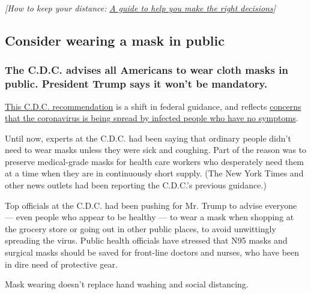 \emph{{[}How to keep your distance:}
\href{https://www.nytimes3xbfgragh.onion/2020/03/19/well/live/coronavirus-quarantine-social-distancing.html}{\emph{A
guide to help you make the right decisions}}\emph{{]}}

\hypertarget{consider-wearing-a-mask-in-public}{%
\subsection{Consider wearing a mask in
public}\label{consider-wearing-a-mask-in-public}}

\hypertarget{the-cdc-advises-all-americans-to-wear-cloth-masks-in-public-president-trump-says-it-wont-be-mandatory}{%
\subsubsection{\texorpdfstring{\textbf{The C.D.C. advises all Americans
to wear cloth masks in public. President Trump says it won't be
mandatory.}}{The C.D.C. advises all Americans to wear cloth masks in public. President Trump says it won't be mandatory.}}\label{the-cdc-advises-all-americans-to-wear-cloth-masks-in-public-president-trump-says-it-wont-be-mandatory}}

\href{https://www.nytimes3xbfgragh.onion/2020/04/03/world/coronavirus-news-updates.html}{This
C.D.C. recommendation} is a shift in federal guidance, and reflects
\href{https://www.nytimes3xbfgragh.onion/2020/03/31/health/coronavirus-asymptomatic-transmission.html}{concerns
that the coronavirus is being spread by infected people who have no
symptoms}.

Until now, experts at the C.D.C. had been saying that ordinary people
didn't need to wear masks unless they were sick and coughing. Part of
the reason was to preserve medical-grade masks for health care workers
who desperately need them at a time when they are in continuously short
supply. (The New York Times and other news outlets had been reporting
the C.D.C.'s previous guidance.)

Top officials at the C.D.C. had been pushing for Mr. Trump to advise
everyone --- even people who appear to be healthy --- to wear a mask
when shopping at the grocery store or going out in other public places,
to avoid unwittingly spreading the virus. Public health officials have
stressed that N95 masks and surgical masks should be saved for
front-line doctors and nurses, who have been in dire need of protective
gear.

Mask wearing doesn't replace hand washing and social distancing.

